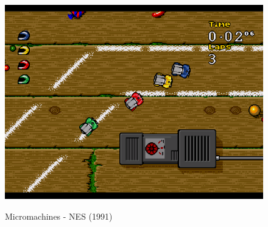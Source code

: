 \begin{frame}
\begin{columns}
        \column{150px}
        \begin{figure}
          \label{logo_latex}
          \begin{center}
            \includegraphics[scale=0.2]{imagenes/micromachines.png}
          \end{center}
          Micromachines - NES (1991)
        \end{figure}

    \end{columns}
    
\end{frame}

